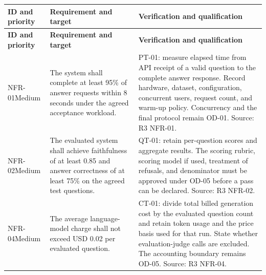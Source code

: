 \documentclass[11pt,letterpaper]{article}
\begin{document}
\begin{longtable}{|P{\arrayrulewidth\relax}|P{\arrayrulewidth\relax}|P{\arrayrulewidth\relax}|}

\hline{}

\textbf{ID and priority} & \textbf{Requirement and target} & \textbf{Verification and qualification} \\ \hline

\endfirsthead

\hline{}

\textbf{ID and priority} & \textbf{Requirement and target} & \textbf{Verification and qualification} \\ \hline

\endhead

\hline\endfoot

\hline\endlastfoot

NFR-01\newline Medium & The system shall complete at least 95\% of answer requests within 8 seconds under the agreed acceptance workload. & PT-01: measure elapsed time from API receipt of a valid question to the complete answer response. Record hardware, dataset, configuration, concurrent users, request count, and warm-up policy. Concurrency and the final protocol remain OD-01. Source: R3 NFR-01. \\ \hline

NFR-02\newline Medium & The evaluated system shall achieve faithfulness of at least 0.85 and answer correctness of at least 75\% on the agreed test questions. & QT-01: retain per-question scores and aggregate results. The scoring rubric, scoring model if used, treatment of refusals, and denominator must be approved under OD-05 before a pass can be declared. Source: R3 NFR-02. \\ \hline

NFR-04\newline Medium & The average language-model charge shall not exceed USD 0.02 per evaluated question. & CT-01: divide total billed generation cost by the evaluated question count and retain token usage and the price basis used for that run. State whether evaluation-judge calls are excluded. The accounting boundary remains OD-05. Source: R3 NFR-04. \\ \hline

\end{longtable}
\end{document}

